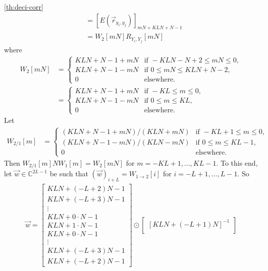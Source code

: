 \documentclass[a4paper, openany, oneside]{memoir}
\begin{document}
\begin{blockProofTheorem}{\ref{th:deci-corr}}
\begin{align*}
        &=[E(\vec{r}_{y_i,y_j})]_{mN+KLN+N-1}\\
        &= W_2[mN] R_{Y_i,Y_j}[mN]
    \end{align*}
    where
    \begin{align*}
        W_2[mN] &= \begin{cases}
            KLN+N-1+mN & \text{if } -KLN-N+2 \le mN \le 0, \\
            KLN+N-1-mN& \text{if } 0 \le mN \le KLN+N-2, \\
            0 & \text{elsewhere.}
        \end{cases} \\
        &= \begin{cases}
            KLN+N-1+mN & \text{if } -KL\le m \le 0, \\
            KLN+N-1-mN& \text{if } 0 \le m \le KL, \\
            0 & \text{elsewhere.}
        \end{cases}
    \end{align*}
    Let
    \begin{align*}
        W_{2/1}[m] &= \begin{cases}
            (KLN+N-1+mN)/(KLN+mN) & \text{if } -KL+1 \le m \le 0, \\
            (KLN+N-1-mN)/(KLN-mN) & \text{if } 0 \le m \le KL-1, \\
            0 & \text{elsewhere.}
        \end{cases}
    \end{align*}
    Then $W_{2/1}[m] N W_1[m] = W_2[mN]$ for $m = -KL+1,\ldots,KL-1$. To this end, let $\vec{w} \in \mathbb{C}^{2L-1}$ be such that $(\vec{w})_{i+L}=W_{1 \to 2}[i]$ for $i = -L+1,\ldots,L-1$. So
    \begin{align*}
        \vec{w} = \begin{bmatrix}
            KLN+(-L+2)N-1 \\
            KLN+(-L+3)N-1 \\
            \vdots \\
            KLN+0\cdot N-1 \\
            KLN+1\cdot N-1 \\
            KLN+0\cdot N-1 \\
            \vdots \\
            KLN+(-L+3)N-1 \\
            KLN+(-L+2)N-1
         \end{bmatrix} \odot \begin{bmatrix}
            [KLN+(-L+1)N]^{-1} \\

\end{bmatrix}
\end{align*}
\end{blockProofTheorem}
\end{document}

